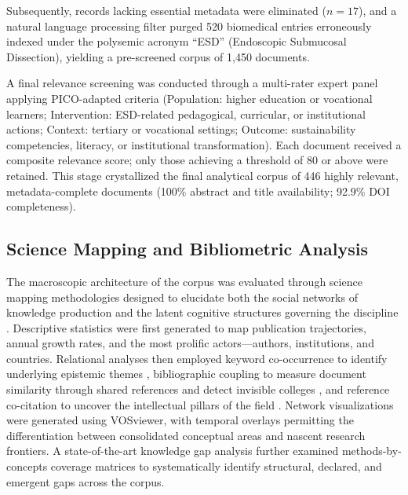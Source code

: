 \documentclass[pdflatex,sn-basic]{sn-jnl}%
\begin{document}
Subsequently, records lacking essential metadata were eliminated ($n = 17$), and a natural language processing filter purged 520 biomedical entries erroneously indexed under the polysemic acronym ``ESD'' (Endoscopic Submucosal Dissection), yielding a pre-screened corpus of 1,450 documents.

A final relevance screening was conducted through a multi-rater expert panel applying PICO-adapted criteria (Population: higher education or vocational learners; Intervention: ESD-related pedagogical, curricular, or institutional actions; Context: tertiary or vocational settings; Outcome: sustainability competencies, literacy, or institutional transformation). Each document received a composite relevance score; only those achieving a threshold of 80 or above were retained. This stage crystallized the final analytical corpus of 446 highly relevant, metadata-complete documents (100\% abstract and title availability; 92.9\% DOI completeness).

\subsection{Science Mapping and Bibliometric Analysis}
\label{sec:analisis_bib}

The macroscopic architecture of the corpus was evaluated through science mapping methodologies designed to elucidate both the social networks of knowledge production and the latent cognitive structures governing the discipline \cite{mazov_methodological_2020, wang_research_2020}. Descriptive statistics were first generated to map publication trajectories, annual growth rates, and the most prolific actors---authors, institutions, and countries. Relational analyses then employed keyword co-occurrence to identify underlying epistemic themes \cite{callon_translations_1983, torcatoru_literature_2022}, bibliographic coupling to measure document similarity through shared references and detect invisible colleges \cite{kessler_bibliographic_1963, karimi_review_2025}, and reference co-citation to uncover the intellectual pillars of the field \cite{yildiz_examining_2019, ali_performance_2019}. Network visualizations were generated using VOSviewer, with temporal overlays permitting the differentiation between consolidated conceptual areas and nascent research frontiers. A state-of-the-art knowledge gap analysis further examined methods-by-concepts coverage matrices to systematically identify structural, declared, and emergent gaps across the corpus.
\end{document}
